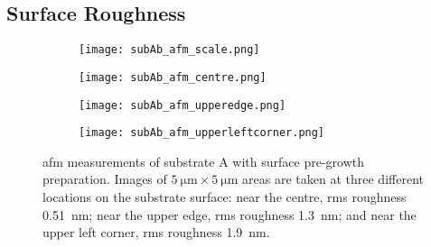 \subsection{Surface Roughness}


\begin{figure}[htbp]
    \centering
    \begin{subfigure}[t]{0.032\linewidth}
    \centering
        \texttt{[image: subAb\_afm\_scale.png]}
        \captionsetup{list=no}
    \end{subfigure}
    \hfill
    \begin{subfigure}[t]{0.3\linewidth}
        \centering
        \texttt{[image: subAb\_afm\_centre.png]}
        \caption{}\label{fig:subAb_afm_centre} %
    \end{subfigure}%
    \hfill
    \begin{subfigure}[t]{0.3\linewidth}
        \centering
        \texttt{[image: subAb\_afm\_upperedge.png]}
        \caption{}\label{fig:subAb_afm_edge} %
    \end{subfigure}%
    \hfill
    \begin{subfigure}[t]{0.3\linewidth}
        \centering
        \texttt{[image: subAb\_afm\_upperleftcorner.png]}
        \caption{}\label{fig:subAb_afm_corner}%
    \end{subfigure}%
    \caption[\Ac{afm} of substrate A with surface pre-growth preparation.]{\Acf{afm} measurements of substrate A with surface pre-growth preparation. Images of $\SI{5}{\micro\metre}\times\SI{5}{\micro\metre}$ areas are taken at three different locations on the substrate surface:  near the centre, \ac{rms} roughness \SI{0.51}{\nano\metre};  near the upper edge, \ac{rms} roughness \SI{1.3}{\nano\metre}; and  near the upper left corner, \ac{rms} roughness \SI{1.9}{\nano\metre}.}\label{fig:subAb_afm}
\end{figure} %

